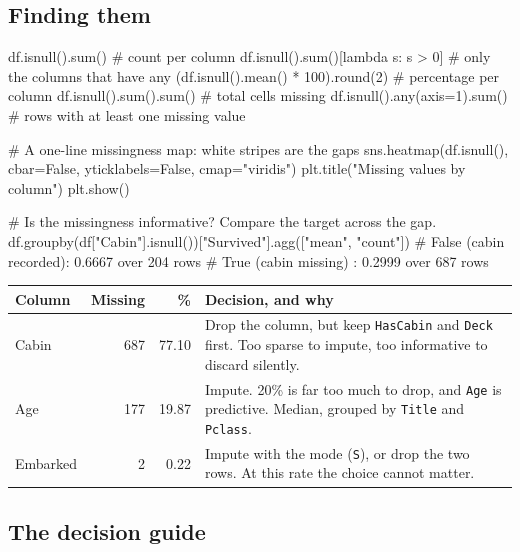 \documentclass[11pt,a4paper]{article}
\begin{document}

\subsection{Finding them}

\begin{py}
df.isnull().sum()                       # count per column
df.isnull().sum()[lambda s: s > 0]      # only the columns that have any
(df.isnull().mean() * 100).round(2)     # percentage per column
df.isnull().sum().sum()                 # total cells missing
df.isnull().any(axis=1).sum()           # rows with at least one missing value

# A one-line missingness map: white stripes are the gaps
sns.heatmap(df.isnull(), cbar=False, yticklabels=False, cmap="viridis")
plt.title("Missing values by column")
plt.show()

# Is the missingness informative? Compare the target across the gap.
df.groupby(df["Cabin"].isnull())["Survived"].agg(["mean", "count"])
# False (cabin recorded): 0.6667 over 204 rows
# True  (cabin missing) : 0.2999 over 687 rows
\end{py}

\begin{tabularx}{\textwidth}{@{}>{\ttfamily}l r r X@{}}
\toprule
\rowcolor{tablehead} \textrm{\bfseries Column} & \textbf{Missing} & \textbf{\%} & \textbf{Decision, and why} \\
\midrule
Cabin & 687 & 77.10 & Drop the column, but keep \texttt{HasCabin} and \texttt{Deck} first. Too sparse to impute, too informative to discard silently. \\
Age & 177 & 19.87 & Impute. 20\% is far too much to drop, and \texttt{Age} is predictive. Median, grouped by \texttt{Title} and \texttt{Pclass}. \\
Embarked & 2 & 0.22 & Impute with the mode (\texttt{S}), or drop the two rows. At this rate the choice cannot matter. \\
\bottomrule
\end{tabularx}

\subsection{The decision guide}
\end{document}
